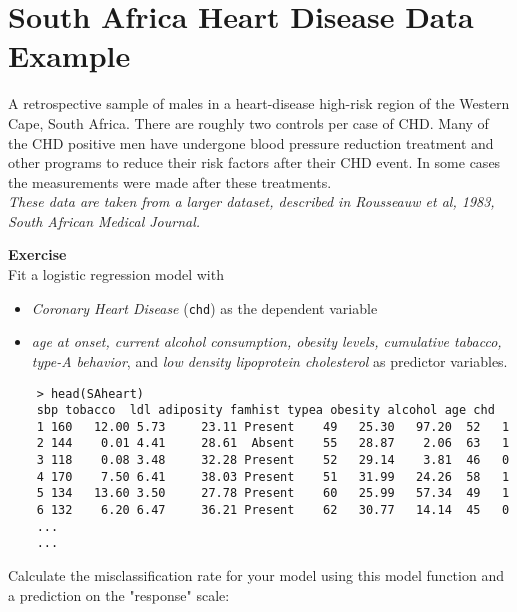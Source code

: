 \documentclass[a4paper,12pt]{article}
\begin{document}
\section*{South Africa Heart Disease Data Example}

\begin{framed}
\noindent A retrospective sample of males in a heart-disease high-risk region
	of the Western Cape, South Africa. There are roughly two controls per
	case of CHD. Many of the CHD positive men have undergone blood
	pressure reduction treatment and other programs to reduce their risk
	factors after their CHD event. In some cases the measurements were
	made after these treatments.\\ \textit{ These data are taken from a larger
	dataset, described in  Rousseauw et al, 1983, South African Medical
	Journal. }
	
\end{framed}
%	
%	

\noindent \textbf{Exercise}\\Fit a logistic regression model with
\begin{itemize}
	\item \textit{Coronary Heart Disease} (\texttt{chd}) as the
	dependent variable
	
	\item \textit{age at onset, current alcohol consumption, obesity levels,
		cumulative tabacco, type-A behavior}, and \textit{low density lipoprotein cholesterol} as predictor variables. 
\end{itemize} 
{
	\large
	
	\begin{verbatim}
	> head(SAheart)
	sbp tobacco  ldl adiposity famhist typea obesity alcohol age chd
	1 160   12.00 5.73     23.11 Present    49   25.30   97.20  52   1
	2 144    0.01 4.41     28.61  Absent    55   28.87    2.06  63   1
	3 118    0.08 3.48     32.28 Present    52   29.14    3.81  46   0
	4 170    7.50 6.41     38.03 Present    51   31.99   24.26  58   1
	5 134   13.60 3.50     27.78 Present    60   25.99   57.34  49   1
	6 132    6.20 6.47     36.21 Present    62   30.77   14.14  45   0
	...
	...
	\end{verbatim}
	
}
\newpage
\noindent Calculate the misclassification rate for your model using this model function and a prediction on the "response" scale:
\end{document}
